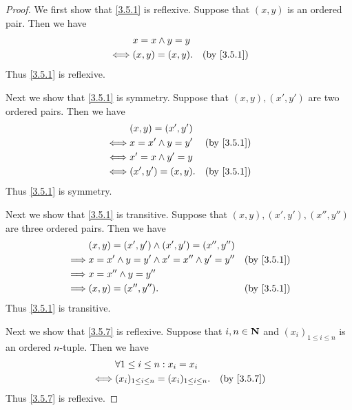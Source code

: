 \begin{proof}
  We first show that \cref{3.5.1} is reflexive.
  Suppose that \((x, y)\) is an ordered pair.
  Then we have
  \begin{align*}
         & x = x \land y = y                            \\
    \iff & (x, y) = (x, y).  & \text{(by \cref{3.5.1})}
  \end{align*}
  Thus \cref{3.5.1} is reflexive.

  Next we show that \cref{3.5.1} is symmetry.
  Suppose that \((x, y), (x', y')\) are two ordered pairs.
  Then we have
  \begin{align*}
         & (x, y) = (x', y')                              \\
    \iff & x = x' \land y = y' & \text{(by \cref{3.5.1})} \\
    \iff & x' = x \land y' = y                            \\
    \iff & (x', y') = (x, y).  & \text{(by \cref{3.5.1})}
  \end{align*}
  Thus \cref{3.5.1} is symmetry.

  Next we show that \cref{3.5.1} is transitive.
  Suppose that \((x, y), (x', y'), (x'', y'')\) are three ordered pairs.
  Then we have
  \begin{align*}
             & (x, y) = (x', y') \land (x', y') = (x'', y'')                                \\
    \implies & x = x' \land y = y' \land x' = x'' \land y' = y'' & \text{(by \cref{3.5.1})} \\
    \implies & x = x'' \land y = y''                                                        \\
    \implies & (x, y) = (x'', y'').                              & \text{(by \cref{3.5.1})}
  \end{align*}
  Thus \cref{3.5.1} is transitive.

  Next we show that \cref{3.5.7} is reflexive.
  Suppose that \(i, n \in \mathbf{N}\) and \((x_i)_{1 \leq i \leq n}\) is an ordered \(n\)-tuple.
  Then we have
  \begin{align*}
         & \forall 1 \leq i \leq n : x_i = x_i                                           \\
    \iff & (x_i)_{1 \leq i \leq n} = (x_i)_{1 \leq i \leq n}. & \text{(by \cref{3.5.7})}
  \end{align*}
  Thus \cref{3.5.7} is reflexive.


\end{proof}
